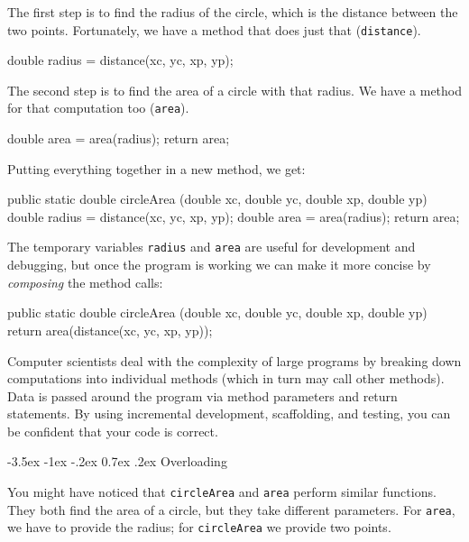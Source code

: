 \documentclass[12pt]{book}
\makeatletter
\theoremstyle{exercise}
\newcommand{\java}[1]{\verb"#1"}
\renewcommand{\section}{\@startsection{section}{1}{\z@}%
    {-3.5ex \@plus -1ex \@minus -.2ex}%
    {0.7ex \@plus.2ex}%
    {\normalfont\Large\bfseries}}
\newcommand{\java}[1]{\lstinline{#1}} %
\makeatother
\begin{document}
The first step is to find the radius of the circle, which is the distance between the two points.
Fortunately, we have a method that does just that (\java{distance}).


\begin{code}
    double radius = distance(xc, yc, xp, yp);
\end{code}

The second step is to find the area of a circle with that radius.
We have a method for that computation too (\java{area}).

\begin{code}
    double area = area(radius);
    return area;
\end{code}

Putting everything together in a new method, we get:

\begin{code}
    public static double circleArea
            (double xc, double yc, double xp, double yp) {
        double radius = distance(xc, yc, xp, yp);
        double area = area(radius);
        return area;
    }
\end{code}

The temporary variables \java{radius} and \java{area} are useful for development and debugging, but once the program is working we can make it more concise by {\it composing} the method calls:

\begin{code}
    public static double circleArea
            (double xc, double yc, double xp, double yp) {
        return area(distance(xc, yc, xp, yp));
    }
\end{code}

Computer scientists deal with the complexity of large programs by breaking down computations into individual methods (which in turn may call other methods).
Data is passed around the program via method parameters and return statements.
By using incremental development, scaffolding, and testing, you can be confident that your code is correct.


\section{Overloading}
\label{overloading}

You might have noticed that \java{circleArea} and \java{area} perform similar functions.
They both find the area of a circle, but they take different parameters.
For \java{area}, we have to provide the radius; for \java{circleArea} we provide two points.
\end{document}
